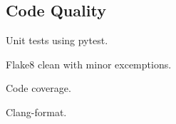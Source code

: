 \subsection{Code Quality}

Unit tests using pytest.

Flake8 clean with minor excemptions.

Code coverage.

Clang-format.
